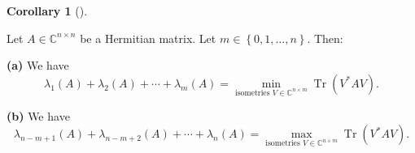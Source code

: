 \documentclass[numbers=enddot,12pt,final,onecolumn,notitlepage]{scrartcl}%
\numberwithin{exer}{subsection}
\theoremstyle{definition}
\newtheorem{coro}[theo]{Corollary}
\newenvironment{corollary}[1][]
{\begin{coro}[#1]\begin{leftbar}}
{\end{leftbar}\end{coro}}
\begin{document}
\begin{corollary}
\label{cor.interlacing.sum-first-m-eigs}Let $A\in\mathbb{C}^{n\times n}$ be a
Hermitian matrix. Let $m\in\left\{  0,1,\ldots,n\right\}  $. Then:

\textbf{(a)} We have%
\[
\lambda_{1}\left(  A\right)  +\lambda_{2}\left(  A\right)  +\cdots+\lambda
_{m}\left(  A\right)  =\min\limits_{\text{isometries }V\in\mathbb{C}^{n\times
m}}\operatorname*{Tr}\left(  V^{\ast}AV\right)  .
\]


\textbf{(b)} We have%
\[
\lambda_{n-m+1}\left(  A\right)  +\lambda_{n-m+2}\left(  A\right)
+\cdots+\lambda_{n}\left(  A\right)  =\max\limits_{\text{isometries }%
V\in\mathbb{C}^{n\times m}}\operatorname*{Tr}\left(  V^{\ast}AV\right)  .
\]

\end{corollary}
\end{document}
